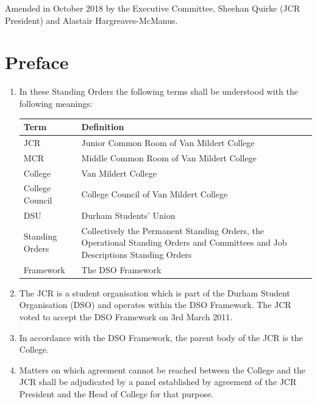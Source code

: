 \documentclass[12pt]{article}  %
\begin{document}
Amended in October 2018 by the Executive Committee, Sheehan Quirke (JCR President) and Alastair Hargreaves-McManus.
\newpage
\tableofcontents{}
\newpage


\section{Preface}
\begin{enumerate}
    \item In these Standing Orders the following terms shall be understood with the following meanings:\\
\begin{tabular}{|p{1.5in}|p{3.8in}|}
\hline
\textbf{Term}   & \textbf{Definition}\\ \hline
JCR             & Junior Common Room of Van Mildert College\\ \hline
MCR             & Middle Common Room of Van Mildert College\\ \hline
College         & Van Mildert College\\ \hline
College Council & College Council of Van Mildert College\\ \hline
DSU             & Durham Students' Union\\ \hline
Standing Orders & Collectively the Permanent Standing Orders, the Operational Standing Orders and Committees and Job Descriptions Standing Orders \\ \hline
Framework       & The DSO Framework\\ \hline
\end{tabular}
    \item The JCR is a student organisation which is part of the Durham Student Organisation (DSO) and operates within the DSO Framework. The JCR voted to accept the DSO Framework on 3rd March 2011.
    \item In accordance with the DSO Framework, the parent body of the JCR is the College.
    \item Matters on which agreement cannot be reached between the College and the JCR shall be adjudicated by a panel established by agreement of the JCR President and the Head of College for that purpose.
\end{enumerate}
\newpage
\end{document}

